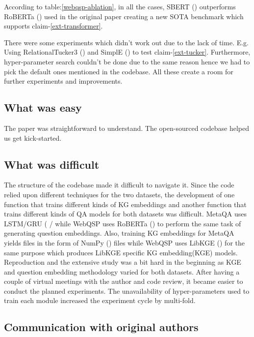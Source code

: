 According to table:\ref{webqsp-ablation}, in all the cases, SBERT (\citep{reimers-2019-sentence-bert}) outperforms RoBERTa (\citep{roberta}) used in the original paper creating a new SOTA benchmark which supports claim-\ref{ext-transformer}.

There were some experiments which didn't work out due to the lack of time. E.g. Using RelationalTucker3 (\citep{wang2019relational}) and SimplE (\citep{simple-embedding}) to test claim-\ref{ext-tucker}. Furthermore, hyper-parameter search couldn't be done due to the same reason hence we had to pick the default ones mentioned in the codebase. All these create a room for further experiments and improvements.

\subsection{What was easy}

The paper was straightforward to understand. The open-sourced codebase helped us get kick-started. 

\subsection{What was difficult}\label{sec:diffcult-reasons}

The structure of the codebase made it difficult to navigate it. Since the code relied upon different techniques for the two datasets, the development of one function that trains different kinds of KG embeddings and another function that trains different kinds of QA models for both datasets was difficult. MetaQA uses LSTM/GRU (\citep{lstm} / \citep{GRU} while WebQSP uses RoBERTa (\citep{roberta}) to perform the same task of generating question embeddings. Also, training KG embeddings for MetaQA yields files in the form of NumPy (\citep{NumPy}) files while WebQSP uses LibKGE (\citep{libkge}) for the same purpose which produces LibKGE specific KG embedding(KGE) models. Reproduction and the extensive study was a bit hard in the beginning as KGE and question embedding methodology varied for both datasets.  After having a couple of virtual meetings with the author and code review, it became easier to conduct the planned experiments. The unavailability of hyper-parameters used to train each module increased the experiment cycle by multi-fold. 

\subsection{Communication with original authors}


